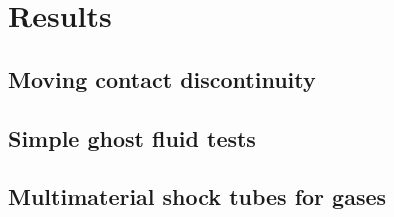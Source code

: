 \documentclass[final,3p,twocolumn]{elsarticle}
\begin{document}
\section{Results}
\label{sec:results}

\subsection{Moving contact discontinuity}
\label{subsec:moving}

\subsection{Simple ghost fluid tests}
\label{subsec:toro}

\subsection{Multimaterial shock tubes for gases}
\label{subsec:shocktubes}

\end{document}
